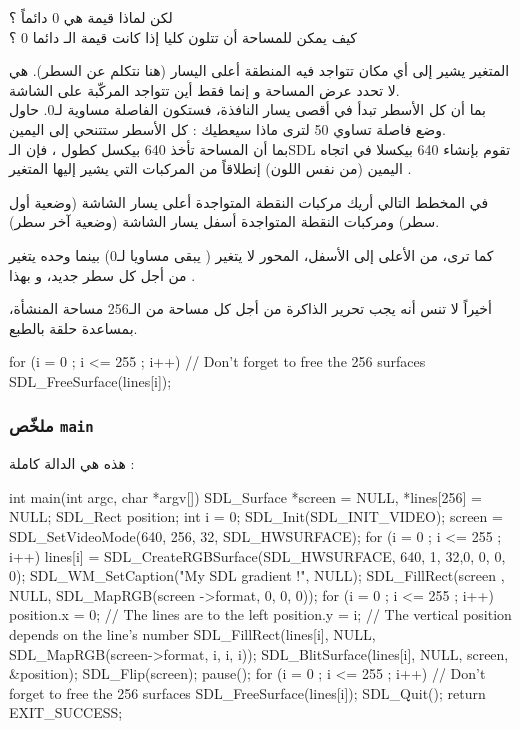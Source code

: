 \begin{question}
لكن لماذا قيمة 
هي 0 دائماً ؟\\
كيف يمكن للمساحة أن تتلون كليا إذا كانت قيمة الـ
دائما 0 ؟
\end{question}

المتغير
يشير إلى أي مكان تتواجد فيه المنطقة أعلى اليسار (هنا نتكلم عن السطر). هي لا تحدد عرض المساحة و إنما فقط أين تتواجد المركّبة على الشاشة.\\
بما أن كل الأسطر تبدأ في أقصى يسار النافذة، فستكون الفاصلة مساوية لـ0. حاول وضع فاصلة تساوي 50 لترى ماذا سيعطيك : كل الأسطر ستتنحي إلى اليمين.\\
بما أن المساحة تأخذ 640 بيكسل كطول ، فإن الـ\textenglish{SDL}
تقوم بإنشاء 640 بيكسلا في اتجاه اليمين (من نفس اللون) إنطلاقاً من المركبات التي يشير إليها المتغير 
.

في المخطط التالي أريك مركبات النقطة المتواجدة أعلى يسار الشاشة (وضعية أول سطر) ومركبات النقطة المتواجدة أسفل يسار الشاشة (وضعية آخر سطر).


كما ترى، من الأعلى إلى الأسفل، المحور لا يتغير 
(
يبقى مساويا لـ0) بينما 
وحده يتغير من أجل كل سطر جديد، و بهذا 
.

أخيراً لا تنس أنه يجب تحرير الذاكرة من أجل كل مساحة من الـ256 مساحة المنشأة، بمساعدة حلقة بالطبع.

\begin{Csource}
for (i = 0 ; i <= 255 ; i++) // Don't forget to free the 256 surfaces
	SDL_FreeSurface(lines[i]);
\end{Csource}

\subsubsection{ملخّص \texttt{main}}

هذه هي الدالة
كاملة :

\begin{Csource}
int main(int argc, char *argv[])
{
	SDL_Surface *screen = NULL, *lines[256] = {NULL};
	SDL_Rect position;
	int i = 0;
	SDL_Init(SDL_INIT_VIDEO);
	screen = SDL_SetVideoMode(640, 256, 32, SDL_HWSURFACE);
	for (i = 0 ; i <= 255 ; i++)
		lines[i] = SDL_CreateRGBSurface(SDL_HWSURFACE, 640, 1, 32,0, 0, 0, 0);
	SDL_WM_SetCaption("My SDL gradient !", NULL);
	SDL_FillRect(screen , NULL, SDL_MapRGB(screen ->format, 0, 0, 0));
	for (i = 0 ; i <= 255 ; i++)
	{
		position.x = 0; // The lines are to the left
		position.y = i; // The vertical position depends on the line's number
		SDL_FillRect(lines[i], NULL, SDL_MapRGB(screen->format, i, i, i));
		SDL_BlitSurface(lines[i], NULL, screen, &position);
	}
	SDL_Flip(screen);
	pause();
	for (i = 0 ; i <= 255 ; i++) // Don't forget to free the 256 surfaces
		SDL_FreeSurface(lines[i]);
	SDL_Quit();
	return EXIT_SUCCESS;
}
\end{Csource}

